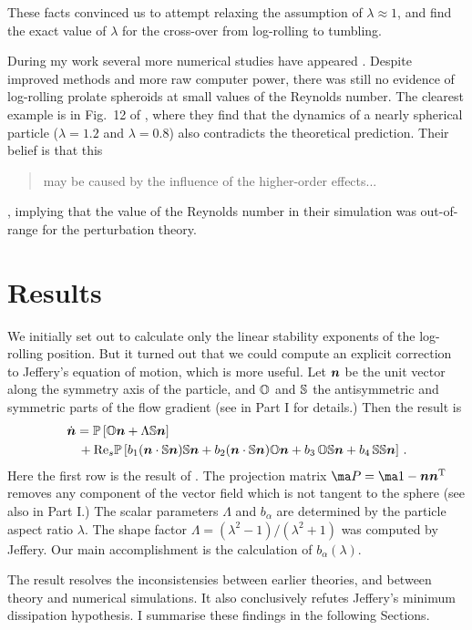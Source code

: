 \documentclass[thesis.tex]{subfiles}
\begin{document}
These facts convinced us to attempt relaxing the assumption of $\lambda\approx1$, and find the exact value of $\lambda$ for the cross-over from log-rolling to tumbling.

During my work several more numerical studies have appeared \cite{rosen2014,mao2014,rosen2015a,rosen2015b}. Despite improved methods and more raw computer power, there was still no evidence of log-rolling prolate spheroids at small values of the Reynolds number. The clearest example is in Fig.~12 of \citet{mao2014}, where they find that the dynamics of a nearly spherical particle ($\lambda=1.2$ and $\lambda=0.8$) also contradicts the theoretical prediction. Their belief is that this \blockquote{may be caused by the influence
of the higher-order effects...}, implying that the value of the Reynolds number in their simulation was out-of-range for the perturbation theory.

\section{Results}

We initially set out to calculate only the linear stability exponents of the log-rolling position. But it turned out that we could compute an explicit correction to Jeffery's equation of motion, which is more useful. Let $\mbox{\boldmath$n$}$ be the unit vector along the symmetry axis of the particle, and $\mathbb{O}$ and $\mathbb{S}$ the antisymmetric and symmetric parts of the flow gradient (see  in Part I for details.) Then the result is
\begin{align}
\eqnlab{ndoteffective}
  \dot {\ve n} &=  
\ma P\left[\ma O \ve n + \Lambda\ma S\ve n\right]\\
&\,+\Reys\ma P\left[b_1 (\ve n \cdot \ma S \ve n)\ma S \ve n
+ b_2 (\ve n \cdot \ma S \ve n)\ma O \ve n 
+b_3\,  \ma O \ma S \ve n 
+ b_4\,  \ma S \ma S \ve n\right]\,. \nn
\end{align}
Here the first row is the result of \citet{jeffery1922}. The projection matrix $\ma P=\ma 1 - \ve n \ve n\transpose$ removes any component of the vector field which is not tangent to the sphere (see also  in Part I.) The scalar parameters $\Lambda$ and $b_\alpha$ are determined by the particle aspect ratio $\lambda$. The shape factor $\Lambda=(\lambda^2-1)/(\lambda^2+1)$ was computed by Jeffery. Our main accomplishment is the calculation of $b_\alpha(\lambda)$.

The result  resolves the inconsistensies between earlier theories, and between theory and numerical simulations. It also conclusively refutes Jeffery's minimum dissipation hypothesis. I summarise these findings in the following Sections.
\end{document}
